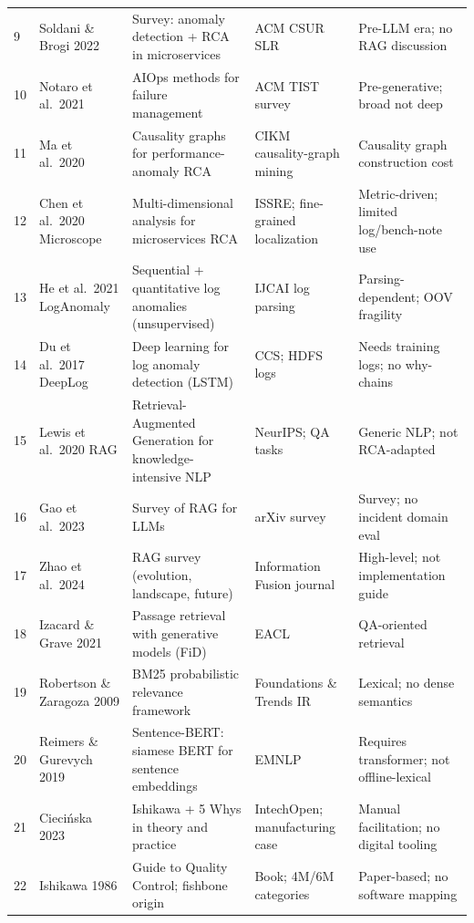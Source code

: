 \documentclass[12pt,a4paper,oneside]{report}
\begin{document}
\begin{landscape}
\begin{longtable}{p{0.6cm} p{3.2cm} p{4.2cm} p{4.2cm} p{5.5cm}}
9 & Soldani \& Brogi 2022 \cite{soldani2022anomaly} & Survey: anomaly detection + RCA in microservices & ACM CSUR SLR & Pre-LLM era; no RAG discussion\\
10 & Notaro et al.\ 2021 \cite{notaro2021ahead} & AIOps methods for failure management & ACM TIST survey & Pre-generative; broad not deep\\
11 & Ma et al.\ 2020 \cite{ma2020automating} & Causality graphs for performance-anomaly RCA & CIKM causality-graph mining & Causality graph construction cost\\
12 & Chen et al.\ 2020 Microscope \cite{chen2020microscope} & Multi-dimensional analysis for microservices RCA & ISSRE; fine-grained localization & Metric-driven; limited log/bench-note use\\
13 & He et al.\ 2021 LogAnomaly \cite{li2021loganomaly} & Sequential + quantitative log anomalies (unsupervised) & IJCAI log parsing & Parsing-dependent; OOV fragility\\
14 & Du et al.\ 2017 DeepLog \cite{du2017deeplog} & Deep learning for log anomaly detection (LSTM) & CCS; HDFS logs & Needs training logs; no why-chains\\
15 & Lewis et al.\ 2020 RAG \cite{lewis2020rag} & Retrieval-Augmented Generation for knowledge-intensive NLP & NeurIPS; QA tasks & Generic NLP; not RCA-adapted\\
16 & Gao et al.\ 2023 \cite{gao2023retrieval} & Survey of RAG for LLMs & arXiv survey & Survey; no incident domain eval\\
17 & Zhao et al.\ 2024 \cite{zhao2024retrieval} & RAG survey (evolution, landscape, future) & Information Fusion journal & High-level; not implementation guide\\
18 & Izacard \& Grave 2021 \cite{izacard2021leveraging} & Passage retrieval with generative models (FiD) & EACL & QA-oriented retrieval\\
19 & Robertson \& Zaragoza 2009 \cite{robertson2009probabilistic} & BM25 probabilistic relevance framework & Foundations \& Trends IR & Lexical; no dense semantics\\
20 & Reimers \& Gurevych 2019 \cite{reimers2019sentencebert} & Sentence-BERT: siamese BERT for sentence embeddings & EMNLP & Requires transformer; not offline-lexical\\
21 & Cieci{\'n}ska 2023 \cite{ciecinska2023identification} & Ishikawa + 5 Whys in theory and practice & IntechOpen; manufacturing case & Manual facilitation; no digital tooling\\
22 & Ishikawa 1986 \cite{ishikawa1986guide} & Guide to Quality Control; fishbone origin & Book; 4M/6M categories & Paper-based; no software mapping\\

\end{longtable}
\end{landscape}
\end{document}

